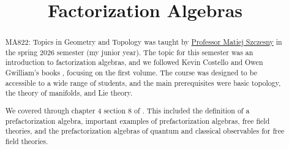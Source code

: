 \documentclass[11pt, letterpaper]{report}
\title{Factorization Algebras}
\begin{document}
    \maketitle

    \begin{abstract}
	    MA822: Topics in Geometry and Topology was taught by \href{https://math.bu.edu/people/szczesny/}{Professor Matiej Szczesny} in the spring 2026 semester (my junior year). The topic for this semester was an introduction to factorization algebras, and we followed Kevin Costello and Owen Gwilliam's books \cite{cg1,cg2}, focusing on the first volume. The course was designed to be accessible to a wide range of students, and the main prerequisites were basic topology, the theory of manifolds, and Lie theory.

	    We covered through chapter 4 section 8 of \cite{cg1}. This included the definition of a prefactorization algebra, important examples of prefactorization algebras, free field theories, and the prefactorization algebras of quantum and classical observables for free field theories.
    \end{abstract}
    
    \tableofcontents
    
    
    
    
    
    
    
    
    
    
    
    
    
    
    
    
    
    
    
    
    
    
\end{document}
